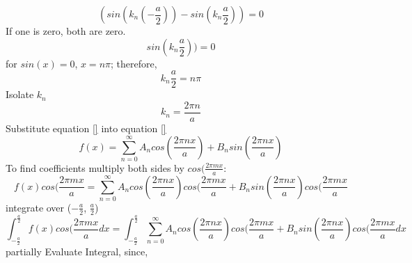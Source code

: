 \documentclass[12pt]{article}
\begin{document}
    \begin{equation} \label{eq: 11-11-15}
        (sin(k_n (-\frac{a}{2})) - sin(k_n \frac{a}{2})) = 0
    \end{equation}        
    If one is zero, both are zero.
    \begin{equation} \label{eq: 11-11-16}
        sin(k_n \frac{a}{2})) = 0
    \end{equation}            
    for $sin(x)=0$, $x=n\pi$; therefore, 
    \begin{equation} \label{eq: 11-11-17}
        k_n \frac{a}{2} = n \pi
    \end{equation}            
    Isolate $k_n$
    \begin{equation} \label{eq: 11-11-18}
        k_n = \frac{2 \pi n}{a}
    \end{equation}            
    Substitute equation \ref{} into equation \ref{}
    \begin{equation} \label{eq: 11-11-19}
        f(x) = \sum_{n=0}^{\infty} A_n cos(\frac{2 \pi n x}{a}) + B_n sin(\frac{2 \pi n x}{a})
    \end{equation}                
    To find coefficients
    \newline multiply both sides by $cos(\frac{2 \pi m x}{a}$:
    \begin{equation} \label{eq: 11-11-20}
        f(x) cos(\frac{2 \pi m x}{a}= \sum_{n=0}^{\infty} A_n cos(\frac{2 \pi n x}{a})cos(\frac{2 \pi m x}{a} + B_n sin(\frac{2 \pi n x}{a})cos(\frac{2 \pi m x}{a}
    \end{equation}                    
    integrate over ($-\frac{a}{2}$, $\frac{a}{2}$)
    \begin{equation} \label{eq: 11-11-21}
        \int_{-\frac{a}{2}}^{\frac{a}{2}}f(x) cos(\frac{2 \pi m x}{a} dx= \int_{-\frac{a}{2}}^{\frac{a}{2}} \sum_{n=0}^{\infty} A_n cos(\frac{2 \pi n x}{a})cos(\frac{2 \pi m x}{a} + B_n sin(\frac{2 \pi n x}{a})cos(\frac{2 \pi m x}{a} dx
    \end{equation}                    
    partially Evaluate Integral, since,
\end{document}
